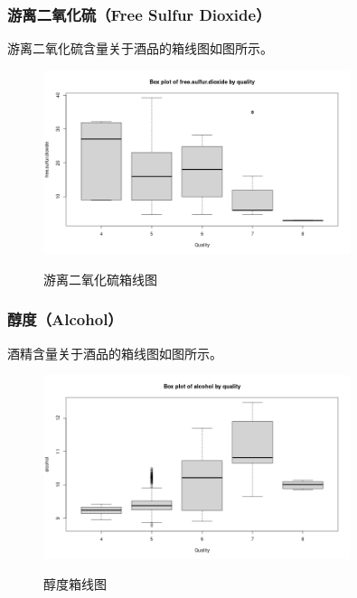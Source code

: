 \documentclass[fontset=ubuntu]{ctexart}
\begin{document}
            \subsubsection{游离二氧化硫（Free Sulfur Dioxide）}
                游离二氧化硫含量关于酒品的箱线图如图所示。
                \begin{figure}[htbp]
                    \centering
                    \includegraphics[width=0.8\textwidth]{../figures/free.sulfur.dioxide-plot.png}
                    \label{fig:free.sulfur.dioxide}
                    \caption{游离二氧化硫箱线图}
                \end{figure}   

            \subsubsection{醇度（Alcohol）}
                酒精含量关于酒品的箱线图如图所示。
                \begin{figure}[htbp]
                    \centering
                    \includegraphics[width=0.8\textwidth]{../figures/alcohol-plot.png}
                    \label{fig:alcohol}
                    \caption{醇度箱线图}
                \end{figure} 
        
\end{document}
